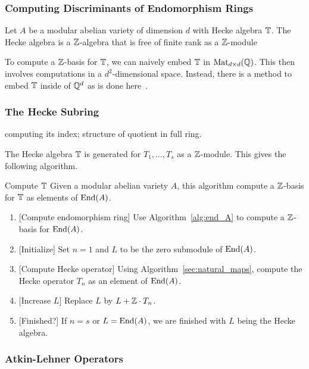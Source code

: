 \documentclass{article}
\begin{document}
\subsubsection{Computing Discriminants of Endomorphism Rings}

Let $A$ be a modular abelian variety of dimension $d$ with Hecke algebra $\mathbb{T}$.
The Hecke algebra is a $\mathbb{Z}$-algebra that is free of finite rank as a
$\mathbb{Z}$-module

To compute a $\mathbb{Z}$-basis for $\mathbb{T}$, we can naively embed $\mathbb{T}$ in $\operatorname{Mat}_{d\times
d}(\mathbb{Q})$. This then involves computations in a $d^2$-dimensional space.
Instead, there is a method to embed $\mathbb{T}$ inside of $\mathbb{Q}^d$ as is done
here~\cite{MR2137350}.

\subsubsection{The Hecke Subring}
computing its index; structure of quotient in full ring.

The Hecke algebra $\mathbb{T}$ is generated for $T_1,\ldots,T_s$ as a
$\mathbb{Z}$-module. This gives the following algorithm.
\begin{algorithm}{Compute $\mathbb{T}$}
    Given a modular abelian variety $A$, this algorithm compute a $\mathbb{Z}$-basis
    for $\mathbb{T}$ as elements of $\operatorname{End}(A)$.
    \begin{enumerate}
        \item{} [Compute endomorphism ring]
            Use Algorithm~\ref{alg:end_A} to compute a $\mathbb{Z}$-basis for
            $\operatorname{End}(A)$.
        \item{} [Initialize]
            Set $n=1$ and $L$ to be the zero submodule of $\operatorname{End}(A)$.
        \item{} [Compute Hecke operator]
            Using Algorithm~\ref{sec:natural_maps}, compute the Hecke operator
            $T_n$ as an element of $\operatorname{End}(A)$.
        \item{} [Increase $L$]
            Replace $L$ by $L+\mathbb{Z}\cdot T_n$.
        \item{} [Finished?]
            If $n=s$ or $L=\operatorname{End}(A)$, we are finished with $L$ being the Hecke
            algebra.
    \end{enumerate}
\end{algorithm} 

\subsubsection{Atkin-Lehner Operators}
\end{document}
